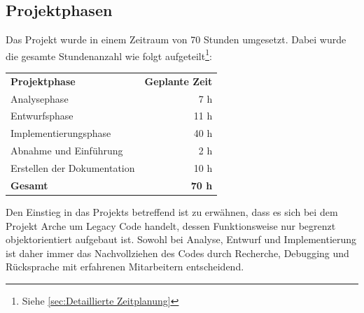 \documentclass[11pt,toc=sectionentrywithoutdots, 
headheight=44pt, headings=optiontoheadandtoc, hyperfootnotes=false, hypertexnames=false]{scrartcl}
\newcommand\extendedref[1]{Siehe \ref{#1}}
\begin{document}
\subsection{Projektphasen}
Das Projekt wurde in einem Zeitraum von 70 Stunden umgesetzt. Dabei wurde die gesamte Stundenanzahl wie folgt aufgeteilt\footnote{\extendedref{sec:Detaillierte Zeitplanung}}:

\begin{table}
\begin{tabular}{lr}

\textbf{Projektphase} 		& \textbf{Geplante Zeit} \\
Analysephase 				& 7 h	 		\\
Entwurfsphase				& 11 h	 		\\
Implementierungsphase 		& 40 h	 		\\
Abnahme und Einführung		& 2 h 			\\
Erstellen der Dokumentation & 10 h 			\\
	\textbf{Gesamt}	 			& \textbf{70 h}	\\
\end{tabular}

\end{table}
Den Einstieg in das Projekts betreffend ist zu erwähnen, dass es sich bei dem Projekt Arche um \gls{Legacy Code} handelt, dessen Funktionsweise nur begrenzt objektorientiert aufgebaut ist. Sowohl bei Analyse, Entwurf und Implementierung ist daher immer das Nachvollziehen des Codes durch Recherche, Debugging und Rücksprache mit erfahrenen Mitarbeitern entscheidend.
\clearpage
\end{document}
